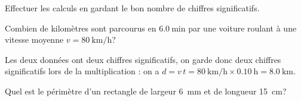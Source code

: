 
\hauteurLargeurCadreReponse		{6mm}{3cm}
\initialisationEntrainement

Effectuer les calculs en gardant le bon nombre de chiffres significatifs.

\debutEntrainement



\begin{enonce}
Combien de kilomètres sont parcourus en $\SI{6,0}{\minute}$ par une voiture roulant à une vitesse moyenne  $v=\SI{80}{\kilo\metre\per\hour}$?
\end{enonce}


\begin{corrige}
Les deux données ont deux chiffres significatifs, on garde donc deux chiffres significatifs lors de la multiplication : on a \(d=v\,t=\SI{80}{\kilo\metre\per\hour}\times\SI{0,10}{\hour}=\SI{8.0}{\kilo\metre}\).
\end{corrige}




\begin{enonce}
Quel est le périmètre d'un rectangle de largeur \SI{6}{\milli\metre} et de longueur \SI{15}{\centi\meter}?
\end{enonce}


